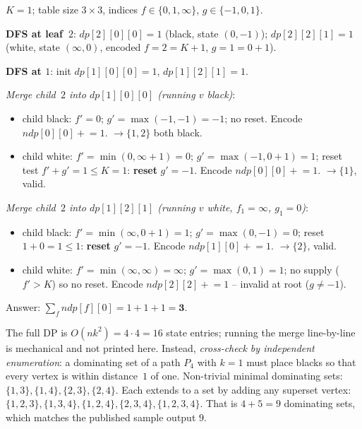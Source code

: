 \begin{tracebox}[Sample~2 -- $n = 2$, $k = 1$, edge $1$--$2$ (answer $3$)]
$K = 1$; table size $3 \times 3$, indices $f \in \{0, 1, \infty\}$, $g \in \{-1, 0, 1\}$.

\textbf{DFS at leaf~$2$}: $\mathit{dp}[2][0][0] = 1$ (black, state $(0, -1)$);
$\mathit{dp}[2][2][1] = 1$ (white, state $(\infty, 0)$, encoded $f = 2 = K+1$, $g = 1 = 0{+}1$).

\textbf{DFS at $1$}: init $\mathit{dp}[1][0][0] = 1$, $\mathit{dp}[1][2][1] = 1$.

\emph{Merge child~$2$ into $\mathit{dp}[1][0][0]$ (running $v$ black)}:
  \begin{itemize}[nosep]
    \item child black: $f' = 0$; $g' = \max(-1, -1) = -1$; no reset. Encode $\mathit{ndp}[0][0] \mathrel{+}= 1$. $\to \{1, 2\}$ both black.
    \item child white: $f' = \min(0, \infty+1) = 0$; $g' = \max(-1, 0+1) = 1$; reset test $f' + g' = 1 \le K = 1$: \textbf{reset} $g' = -1$. Encode $\mathit{ndp}[0][0] \mathrel{+}= 1$. $\to \{1\}$, valid.
  \end{itemize}

\emph{Merge child~$2$ into $\mathit{dp}[1][2][1]$ (running $v$ white, $f_1 = \infty$, $g_1 = 0$)}:
  \begin{itemize}[nosep]
    \item child black: $f' = \min(\infty, 0+1) = 1$; $g' = \max(0, -1) = 0$; reset $1 + 0 = 1 \le 1$: \textbf{reset} $g' = -1$. Encode $\mathit{ndp}[1][0] \mathrel{+}= 1$. $\to \{2\}$, valid.
    \item child white: $f' = \min(\infty, \infty) = \infty$; $g' = \max(0, 1) = 1$; no supply ($f' > K$) so no reset. Encode $\mathit{ndp}[2][2] \mathrel{+}= 1$ -- invalid at root ($g \ne -1$).
  \end{itemize}

Answer: $\sum_f \mathit{ndp}[f][0] = 1 + 1 + 1 = \mathbf{3}$. \checkmark
\end{tracebox}

\begin{tracebox}[Sample~3 -- $n = 4$, $k = 1$, path $1$--$2$--$3$--$4$ (answer $9$)]
The full DP is $O(n k^2) = 4 \cdot 4 = 16$ state entries; running the merge
line-by-line is mechanical and not printed here. Instead, \emph{cross-check by
independent enumeration}: a dominating set of a path $P_4$ with $k = 1$ must
place blacks so that every vertex is within distance~$1$ of one.
Non-trivial minimal dominating sets: $\{1,3\}, \{1,4\}, \{2,3\}, \{2,4\}$.
Each extends to a set by adding any superset vertex: $\{1,2,3\}, \{1,3,4\},
\{1,2,4\}, \{2,3,4\}, \{1,2,3,4\}$. That is $4 + 5 = 9$ dominating sets, which
matches the published sample output $9$. \checkmark
\end{tracebox}

